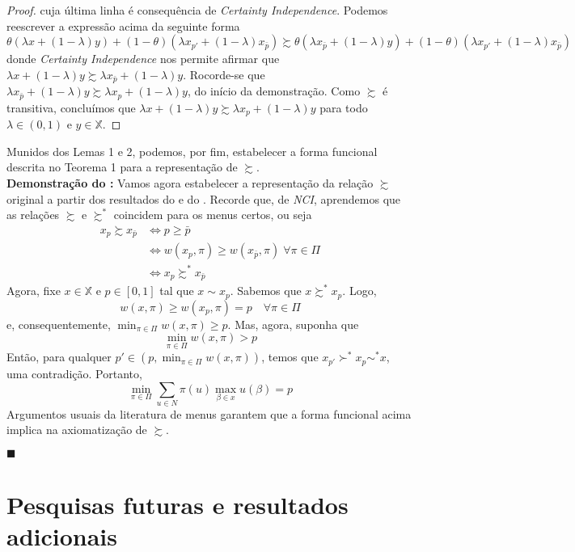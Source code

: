 \documentclass[12pt, a4paper]{article}
\theoremstyle{nonumberplain}
\newtheorem{proof}{Dem.}
\theoremstyle{plain}
\theoremstyle{plain}
\theoremstyle{plain}
\theoremstyle{nonumberplain}
\begin{document}
\begin{proof}
cuja última linha é consequência de \emph{Certainty Independence}. Podemos reescrever a expressão acima da seguinte forma
$$ \theta (\lambda x + (1-\lambda)y)+(1-\theta)(\lambda x_{p'}+(1-\lambda)x_{\bar{p}}) \succsim \theta (\lambda x_{\bar{p}} + (1-\lambda)y)+(1-\theta)(\lambda x_{p'}+(1-\lambda)x_{\bar{p}})$$
donde \emph{Certainty Independence} nos permite afirmar que $\lambda x + (1-\lambda)y\succsim \lambda x_{\bar{p}} + (1-\lambda)y$. Rocorde-se que $\lambda x_{\bar{p}} + (1-\lambda)y\succsim \lambda x_p + (1-\lambda)y$, do início da demonstração. Como $\succsim$ é transitiva, concluímos que $\lambda x + (1-\lambda)y\succsim \lambda x_p + (1-\lambda)y$ para todo $\lambda \in (0,1)$ e $y\in \mathbb{X}$.
\end{proof}

Munidos dos Lemas 1 e 2, podemos, por fim, estabelecer a forma funcional descrita no Teorema 1 para a representação de $\succsim$. \\

\noindent
\textbf{Demonstração do :} Vamos agora estabelecer a representação da relação $\succsim$ original a partir dos resultados do  e do . Recorde que, de \emph{NCI}, aprendemos que as relações $\succsim$ e $\succsim^*$ coincidem para os menus certos, ou seja
\begin{align*}
x_p\succsim x_{\bar{p}}&\Leftrightarrow p\geq \bar{p}\\
&\Leftrightarrow w(x_p,\pi)\geq w(x_{\bar{p}},\pi)\; \forall\pi\in\Pi \\
&\Leftrightarrow x_p\succsim^* x_{\bar{p}}
\end{align*}
Agora, fixe $x\in \mathbb{X}$ e $p\in[0,1]$ tal que $x\sim x_p$. Sabemos que $x\succsim^* x_p$. Logo, $$w(x,\pi)\geq w(x_p,\pi)=p\quad\forall\pi \in \Pi$$ e, consequentemente, $\min_{\pi\in\Pi}w(x,\pi)\geq p$. Mas, agora, suponha que $$\min_{\pi\in\Pi}w(x,\pi)> p$$ Então, para qualquer $p'\in (p,\min_{\pi\in\Pi}w(x,\pi))$, temos que $x_{p'}\succ^* x_p\sim^* x$, uma contradição. Portanto, $$\min_{\pi\in\Pi}\sum_{u\in N} \pi(u)\max_{\beta\in x}u(\beta)=p$$
Argumentos usuais da literatura de menus garantem que a forma funcional acima implica na axiomatização de $\succsim$.
\begin{flushright}
$\blacksquare$
\end{flushright}
\clearpage
\section{Pesquisas futuras e resultados adicionais}
\end{document}
